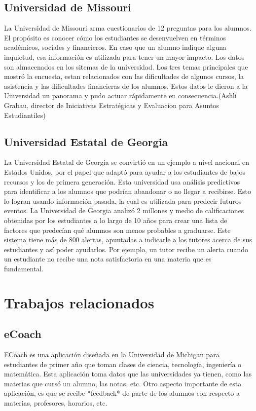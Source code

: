 \subsection[Universidad de Missouri]{Universidad de Missouri}
La Universidad de Missouri arma cuestionarios de 12 preguntas para los alumnos. El propósito es conocer cómo los estudiantes se desenvuelven en términos académicos, sociales y financieros. En caso que un alumno indique alguna inquietud, esa información es utilizada para tener un mayor impacto. Los datos son almacenados en los sitemas de la universidad.
Los tres temas principales que mostró la encuesta, estan relacionados con las dificultades de algunos cursos, la asistencia y las dificultades financieras de los alumnos. Estos datos le dieron a la Universidad un panorama y pudo actuar rápidamente en consecuencia.(Ashli Grabau, director de Iniciativas Estratégicas y Evaluacion para Asuntos Estudiantiles)

\subsection[Universidad Estatal de Georgia]{Universidad Estatal de Georgia}

La Universidad Estatal de Georgia se convirtió en un ejemplo a nivel nacional en Estados Unidos, por el papel que adaptó para ayudar a los estudiantes de bajos recursos y los de primera generación. 
Esta universidad usa análisis predictivos para identificar a los alumnos que podrían abandonar o no llegar a recibirse. Esto lo logran usando información pasada, la cual es utilizada para predecir futuros eventos. 
La Universidad de Georgia analizó 2 millones y medio de calificaciones obtenidas por los estudiantes a lo largo de 10 años para crear una lista de factores que predecían qué alumnos son menos probables a graduarse. Este sistema tiene más de 800 alertas, apuntadas a indicarle a los tutores acerca de sus estudiantes y así poder ayudarlos. Por ejemplo, un tutor recibe un alerta cuando un estudiante no recibe una nota satisfactoria en una materia que es fundamental. 





\section[Trabajos relacionados]{Trabajos relacionados}

\subsection[eCoach]{eCoach}
ECoach es una aplicación diseñada en la Universidad de Michigan para estudiantes de primer año que toman clases de ciencia, tecnología, ingeniería o matemática. Esta aplicación toma datos que las universidades ya tienen, como las materias que cursó un alumno, las notas, etc.
Otro aspecto importante de esta aplicación, es que se recibe *feedback* de parte de los alumnos con respecto a materias, profesores, horarios, etc.


